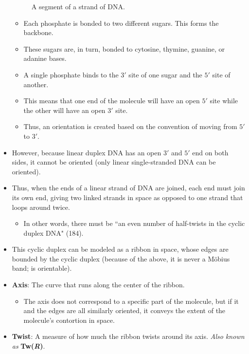 \documentclass[titlepage]{article}
\numberwithin{figure}{section}
\numberwithin{table}{section}
\numberwithin{equation}{section}
\newcommand{\dq}[2]{``#1" (#2).}
\begin{document}
\begin{itemize}
\begin{figure}[h!]
        \vspace{2.3em}
        \caption{A segment of a strand of DNA.}
        \label{fig:DNA2bits}
    \end{figure}
    \begin{itemize}
        \item Each phosphate is bonded to two different sugars. This forms the backbone.
        \item These sugars are, in turn, bonded to cytosine, thymine, guanine, or adanine bases.
        \item A single phosphate binds to the $3'$ site of one sugar and the $5'$ site of another.
        \item This means that one end of the molecule will have an open $5'$ site while the other will have an open $3'$ site.
        \item Thus, an orientation is created based on the convention of moving from $5'$ to $3'$.
    \end{itemize}
    \item However, because linear duplex DNA has an open $3'$ and $5'$ end on both sides, it cannot be oriented (only linear single-stranded DNA can be oriented).
    \item Thus, when the ends of a linear strand of DNA are joined, each end must join its own end, giving two linked strands in space as opposed to one strand that loops around twice.
    \begin{itemize}
        \item In other words, there must be \dq{an even number of half-twists in the cyclic duplex DNA}{184}
    \end{itemize}
    \item This cyclic duplex can be modeled as a ribbon in space, whose edges are bounded by the cyclic duplex (because of the above, it is never a M\"{o}bius band; is orientable).
    \item \textbf{Axis}: The curve that runs along the center of the ribbon.
    \begin{itemize}
        \item The axis does not correspond to a specific part of the molecule, but if it and the edges are all similarly oriented, it conveys the extent of the molecule's contortion in space.
    \end{itemize}
    \item \textbf{Twist}: A measure of how much the ribbon twists around its axis. \emph{Also known as} \textbf{Tw(\emph{R})}.

\end{itemize}
\end{document}
